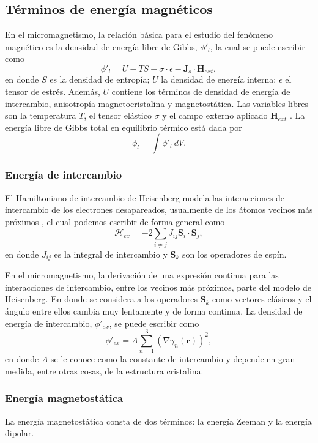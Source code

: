\subsection{Términos de energía magnéticos}
En el micromagnetismo, la relación básica para el estudio del fenómeno magnético es la densidad de energía libre de Gibbs, $\phi'_l$, la cual se puede escribir como \[ \phi'_l = U - T S - \sigma \cdot \epsilon - \bm{J}_s \cdot \bm{H}_{ext},\] en donde $S$ es la densidad de entropía; $U$ la densidad de energía interna; $\epsilon$ el tensor de estrés. Además, $U$ contiene los términos de densidad de energía de intercambio, anisotropía magnetocristalina y magnetostática. Las variables libres son la temperatura $T$, el tensor elástico $\sigma$ y el campo externo aplicado $\bm{H}_{ext}$ \cite{KronmüllerMicromagnetism,Exl2020}. La energía libre de Gibbs total en equilibrio térmico está dada por \[ \phi_l = \int \phi'_l ~ dV .\]
\subsubsection{Energía de intercambio}
El Hamiltoniano de intercambio de Heisenberg modela las interacciones de intercambio de los electrones desapareados, usualmente de los átomos vecinos más próximos \cite{coey_2010}, el cual podemos escribir de forma general como \[ \mathcal{H}_{ex} = - 2 \sum_{i \neq j} J_{ij} \bm{S}_i \cdot \bm{S}_j ,\] en donde $J_{ij}$ es la integral de intercambio y $\bm{S}_k$ son los operadores de espín.

\vspace{10pt}

En el micromagnetismo, la derivación de una expresión continua para las interacciones de intercambio, entre los vecinos más próximos, parte del modelo de Heisenberg. En donde se considera a los operadores $\bm{S}_k$ como vectores clásicos y el ángulo entre ellos cambia muy lentamente y de forma continua\cite{Exl2020}. La densidad de energía de intercambio, $\phi'_{ex}$, se puede escribir como \[ \phi'_{ex} = A \sum_{n=1}^3 (\nabla \gamma_n (\bm{r}) )^2 ,\] en donde $A$ se le conoce como la constante de intercambio y depende en gran medida, entre otras cosas, de la estructura cristalina. 


\subsubsection{Energía magnetostática}
La energía magnetostática consta de dos términos: la energía Zeeman y la energía dipolar.

